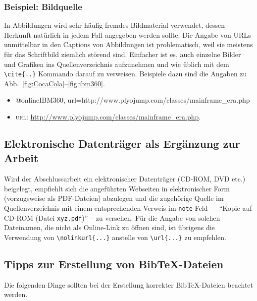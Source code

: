 \subsubsection{Beispiel: Bildquelle}

In Abbildungen wird sehr häufig fremdes Bildmaterial verwendet, dessen Herkunft natürlich 
in jedem Fall angegeben werden sollte. Die Angabe von URLs unmittelbar in den Captions von Abbildungen
ist problematisch, weil sie meistens für das Schriftbild ziemlich störend sind.
Einfacher ist es, auch einzelne Bilder und Grafiken ins Quellenverzeichnis aufzunehmen und
wie üblich mit dem \verb!\cite{..}! Kommando darauf zu verweisen.
Beispiele dazu sind die Angaben zu Abb.\ \ref{fig:CocaCola}--\ref{fig:ibm360}.
%
\begin{itemize}
\item[]
\begin{GenericCode}[numbers=none]
@online{IBM360,
	url={http://www.plyojump.com/classes/mainframe_era.php}
}
\end{GenericCode}
\item[\cite{IBM360}]
\textsc{url}: \url{http://www.plyojump.com/classes/mainframe_era.php}.
\end{itemize}
%

\subsection{Elektronische Datenträger als Ergänzung zur Arbeit}

Wird der Abschlussarbeit ein elektronischer Datenträger (CD-ROM, DVD
etc.) beigelegt, empfiehlt sich die angeführten Webseiten in
elektronischer Form (vorzugsweise als PDF-Da\-tei\-en) abzulegen
und die zugehörige Quelle im Quellenverzeichnis mit einem 
entsprechenden Verweis im \texttt{note}-Feld -- \zB\
"`Kopie auf CD-ROM (Datei \nolinkurl{xyz.pdf})"' --
zu versehen.
Für die Angabe von solchen Dateinamen, die nicht als Online-Link
zu öffnen sind, ist übrigens die Verwendung von 
\verb!\nolinkurl{...}! anstelle von \verb!\url{...}! zu empfehlen.


\subsection{Tipps zur Erstellung von BibTeX-Dateien}
\label{sec:TippsZuBibtex}

Die folgenden Dinge sollten bei der Erstellung korrekter BibTeX-Dateien beachtet werden.

